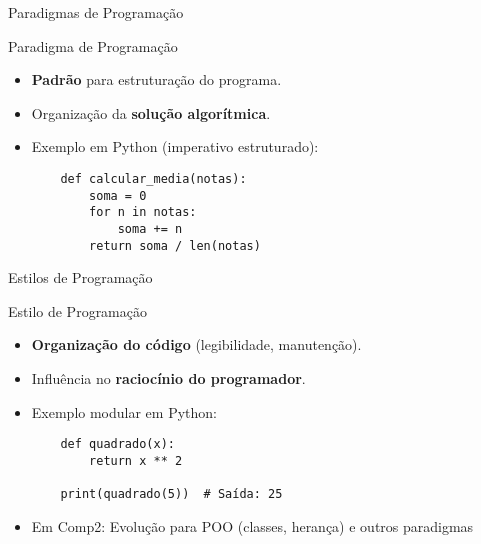 \begin{frame}[fragile]{Paradigmas de Programação}


    \begin{block}{Paradigma de Programação}
        \begin{itemize}
            \item \textbf{Padrão} para estruturação do programa.
            \item Organização da \textbf{solução algorítmica}.
            \item Exemplo em Python (imperativo estruturado):
                  \begin{verbatim}
    def calcular_media(notas):
        soma = 0
        for n in notas:
            soma += n
        return soma / len(notas)
    \end{verbatim}
        \end{itemize}
    \end{block}
\end{frame}
\begin{frame}[fragile]{Estilos de Programação}
    \begin{block}{Estilo de Programação}
        \begin{itemize}
            \item \textbf{Organização do código} (legibilidade, manutenção).
            \item Influência no \textbf{raciocínio do programador}.
            \item Exemplo modular em Python:
                  \begin{verbatim}
    def quadrado(x):
        return x ** 2

    print(quadrado(5))  # Saída: 25
    \end{verbatim}
        \end{itemize}
    \end{block}

    \centering
    \begin{itemize}
        \item Em Comp2: Evolução para POO (classes, herança) e outros paradigmas

    \end{itemize}
\end{frame}



